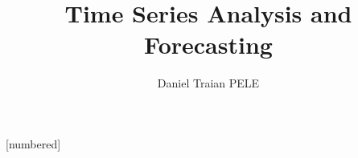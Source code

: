\theoremstyle{definition}
[numbered]
\newtheorem{defn}{Definition}
\newtheorem{thm}{Theorem}
\newtheorem{prop}{Proposition}
\newtheorem{rmk}{Remark}

\newenvironment{cminipage}[1]{%
    \par\noindent\hfill\begin{minipage}{#1}\ignorespaces
}{%
    \end{minipage}\hfill\null\par
}

\newcommand{\E}{\mathbb{E}}
\newcommand{\Var}{\text{Var}}
\newcommand{\Cov}{\text{Cov}}
\newcommand{\Corr}{\text{Corr}}
\newcommand{\R}{\mathbb{R}}
\newcommand{\N}{\mathbb{N}}
\newcommand{\Z}{\mathbb{Z}}
\newcommand{\B}{\mathbf{B}}
\newcommand{\imark}{\textcolor{MainBlue}{\textbullet}}
\newcommand{\RMSE}{\text{RMSE}}
\newcommand{\MAE}{\text{MAE}}
\newcommand{\MAPE}{\text{MAPE}}

\newcommand{\bY}{\mathbf{Y}}
\newcommand{\bX}{\mathbf{X}}
\newcommand{\bA}{\mathbf{A}}
\newcommand{\bB}{\mathbf{B}}
\newcommand{\bepsilon}{\boldsymbol{\varepsilon}}
\newcommand{\bSigma}{\boldsymbol{\Sigma}}
\newcommand{\bPhi}{\boldsymbol{\Phi}}
\newcommand{\bGamma}{\boldsymbol{\Gamma}}
\newcommand{\bPi}{\boldsymbol{\Pi}}
\newcommand{\bc}{\mathbf{c}}
\newcommand{\balpha}{\boldsymbol{\alpha}}
\newcommand{\bbeta}{\boldsymbol{\beta}}

\title[Time Series Analysis]{Time Series Analysis and Forecasting}
\author[D.T. Pele]{Daniel Traian PELE}
\date{}
